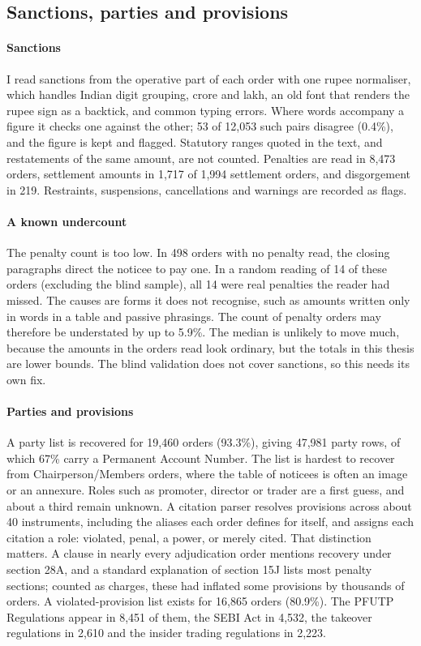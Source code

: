 \documentclass[letterpaper,11pt,leqno]{article}
\begin{document}
\subsection{Sanctions, parties and provisions}\label{s:sanctions-data}

\paragraph{Sanctions} I read sanctions from the operative part of each order with one rupee normaliser, which handles Indian digit grouping, crore and lakh, an old font that renders the rupee sign as a backtick, and common typing errors. Where words accompany a figure it checks one against the other; 53 of 12,053 such pairs disagree (0.4\%), and the figure is kept and flagged. Statutory ranges quoted in the text, and restatements of the same amount, are not counted. Penalties are read in 8,473 orders, settlement amounts in 1,717 of 1,994 settlement orders, and disgorgement in 219. Restraints, suspensions, cancellations and warnings are recorded as flags.

\paragraph{A known undercount} The penalty count is too low. In 498 orders with no penalty read, the closing paragraphs direct the noticee to pay one. In a random reading of 14 of these orders (excluding the blind sample), all 14 were real penalties the reader had missed. The causes are forms it does not recognise, such as amounts written only in words in a table and passive phrasings. The count of penalty orders may therefore be understated by up to 5.9\%. The median is unlikely to move much, because the amounts in the orders read look ordinary, but the totals in this thesis are lower bounds. The blind validation does not cover sanctions, so this needs its own fix.

\paragraph{Parties and provisions} A party list is recovered for 19,460 orders (93.3\%), giving 47,981 party rows, of which 67\% carry a Permanent Account Number. The list is hardest to recover from Chairperson/Members orders, where the table of noticees is often an image or an annexure. Roles such as promoter, director or trader are a first guess, and about a third remain unknown. A citation parser resolves provisions across about 40 instruments, including the aliases each order defines for itself, and assigns each citation a role: violated, penal, a power, or merely cited. That distinction matters. A clause in nearly every adjudication order mentions recovery under section 28A, and a standard explanation of section 15J lists most penalty sections; counted as charges, these had inflated some provisions by thousands of orders. A violated-provision list exists for 16,865 orders (80.9\%). The PFUTP Regulations appear in 8,451 of them, the SEBI Act in 4,532, the takeover regulations in 2,610 and the insider trading regulations in 2,223.
\end{document}
